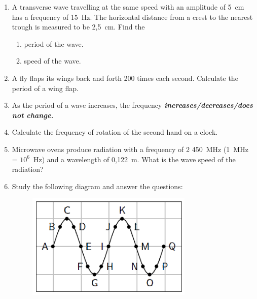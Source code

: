 \begin{enumerate}[noitemsep, label=\textbf{\arabic*}. ]
\begin{enumerate}[noitemsep, label=\textbf{\alph*}. ]
\end{enumerate}
                \label{m38806*uid47}\item A transverse wave travelling at the same speed with an amplitude of 5~cm has a frequency of 15~Hz. The horizontal distance from a crest to the nearest trough is measured to be 2,5~cm. Find the
\label{m38806*id321026}\begin{enumerate}[noitemsep, label=\textbf{\alph*}. ] 
            \label{m38806*uid48}\item period of the wave.
\label{m38806*uid49}\item speed of the wave.
\end{enumerate}
                \label{m38806*uid50}\item A fly flaps its wings back and forth 200 times each second. Calculate the period of a wing flap.\newline
\label{m38806*uid51}\item As the period of a wave increases, the frequency 
\textsl{\textbf{increases/decreases/does not change.}}\newline
\label{m38806*uid52}\item Calculate the frequency of rotation of the second hand on a clock.\newline
\label{m38806*uid53}\item Microwave ovens produce radiation with a frequency of 2 450~MHz (1~MHz = ${10}^{6}$~Hz) and a wavelength of 0,122~m. What is the wave speed of the radiation?\newline
\label{m38806*uid54}\item Study the following diagram and answer the questions:
    \setcounter{subfigure}{0}
	\begin{figure}[H] %
    \begin{center}
    \label{m38806*id321151!!!underscore!!!media}\label{m38806*id321151!!!underscore!!!printimage}\includegraphics[width=300px]{col11305.imgs/m38806_PG10C5_014.png} %

\end{center}
\end{figure}
\end{enumerate}
